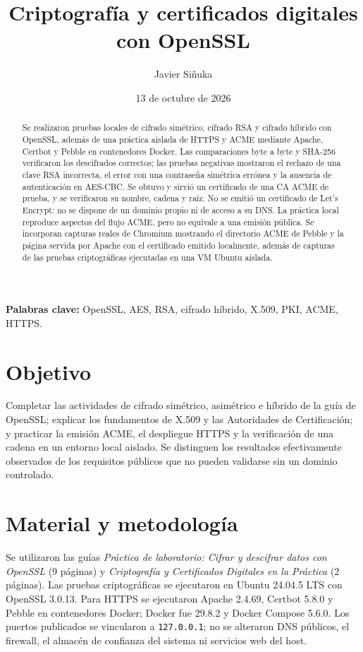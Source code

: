 \documentclass[11pt,a4paper]{article}
\title{Criptografía y certificados digitales con OpenSSL}
\author{Javier Siñuka}
\date{13 de octubre de 2026}
\begin{document}
\maketitle

\begin{abstract}
Se realizaron pruebas locales de cifrado simétrico, cifrado RSA y cifrado
híbrido con OpenSSL, además de una práctica aislada de HTTPS y ACME mediante
Apache, Certbot y Pebble en contenedores Docker. Las comparaciones byte a byte
y SHA-256 verificaron los descifrados correctos; las pruebas negativas
mostraron el rechazo de una clave RSA incorrecta, el error con una contraseña
simétrica errónea y la ausencia de autenticación en AES-CBC. Se obtuvo y sirvió
un certificado de una CA ACME de prueba, y se verificaron su nombre, cadena y
raíz. No se emitió un certificado de Let's Encrypt: no se dispone de un dominio
propio ni de acceso a su DNS. La práctica local reproduce aspectos del flujo
ACME, pero no equivale a una emisión pública. Se incorporan capturas reales de
Chromium mostrando el directorio ACME de Pebble y la página servida por Apache
con el certificado emitido localmente, además de capturas de las pruebas
criptográficas ejecutadas en una VM Ubuntu aislada.
\end{abstract}

\noindent\textbf{Palabras clave:} OpenSSL, AES, RSA, cifrado híbrido, X.509, PKI,
ACME, HTTPS.

\section{Objetivo}
Completar las actividades de cifrado simétrico, asimétrico e híbrido de la guía
de OpenSSL; explicar los fundamentos de X.509 y las Autoridades de
Certificación; y practicar la emisión ACME, el despliegue HTTPS y la
verificación de una cadena en un entorno local aislado. Se distinguen los
resultados efectivamente observados de los requisitos públicos que no pueden
validarse sin un dominio controlado.

\section{Material y metodología}
Se utilizaron las guías \emph{Práctica de laboratorio: Cifrar y descifrar
datos con OpenSSL} (9 páginas) y \emph{Criptografía y Certificados Digitales
en la Práctica} (2 páginas). Las pruebas criptográficas se ejecutaron en
Ubuntu 24.04.5 LTS con OpenSSL 3.0.13. Para HTTPS se ejecutaron Apache 2.4.69,
Certbot 5.8.0 y Pebble en contenedores Docker; Docker fue 29.8.2 y Docker
Compose 5.6.0. Los puertos publicados se vincularon a \texttt{127.0.0.1}; no
se alteraron DNS públicos, el firewall, el almacén de confianza del sistema ni
servicios web del host.
\end{document}
